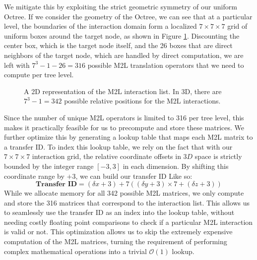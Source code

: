 We mitigate this by exploiting the strict geometric symmetry of our uniform Octree. If we consider the geometry of the Octree, we can see that at a particular level, the boundaries of the interaction domain form a localized $7\times7\times7$ grid of uniform boxes around the target node, as shown in Figure \ref{fig:m2l-7x7-grid}. Discounting the center box, which is the target node itself, and the 26 boxes that are direct neighbors of the target node, which are handled by direct computation, we are left with $7^3 - 1 - 26 = 316$ possible \ac{M2L} translation operators that we need to compute per tree level. 
\begin{figure}[htpb]
    \centering
    
    \caption{A 2D representation of the M2L interaction list. In 3D, there are $7^3 - 1 = 342$ possible relative positions for the M2L interactions. \cite{kohnkecudafastmultipole2021}}
    \label{fig:m2l-7x7-grid}
    
\end{figure}

Since the number of unique \ac{M2L} operators is limited to 316 per tree level, this makes it practically feasible for us to precompute and store these matrices. We further optimize this by generating a lookup table that maps each \ac{M2L} matrix to a transfer ID. To index this lookup table, we rely on the fact that with our $7\times7\times7$ interaction grid, the relative coordinate offsets in $3D$ space is strictly bounded by the integer range $[-3, 3]$ in each dimension. By shifting this coordinate range  by $+3$, we can build our transfer ID Like so:
\begin{equation*}
   \textbf{Transfer ID} = (\delta x + 3) + 7 \left( (\delta y + 3) \times 7 + (\delta z + 3)\right)
\end{equation*}
While we allocate memory for all 342 possible \ac{M2L} matrices, we only compute and store the 316 matrices that correspond to the interaction list. This allows us to seamlessly use the transfer ID as an index into the lookup table, without needing costly floating point comparisons to check if a particular \ac{M2L} interaction is valid or not. This optimization allows us to skip the extremely expensive computation of the \ac{M2L} matrices, turning the requirement of performing complex mathematical operations into a trivial $\mathcal{O}(1)$ lookup.
